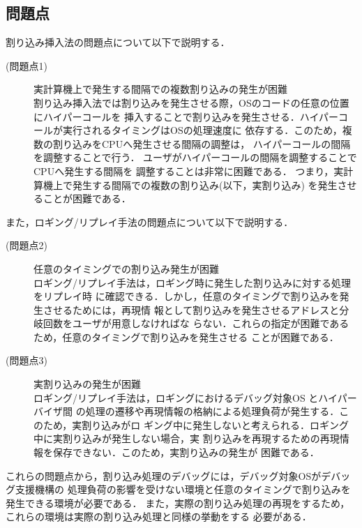 \documentclass[submit,techreq,noauthor,dvipdfmx]{ipsj}
\begin{document}
\subsection{問題点}\label{sec:problem}

割り込み挿入法の問題点について以下で説明する．

\begin{description}
    \item[(問題点1)]実計算機上で発生する間隔での複数割り込みの発生が困難\\
        割り込み挿入法では割り込みを発生させる際，OSのコードの任意の位置にハイパーコールを
        挿入することで割り込みを発生させる．ハイパーコールが実行されるタイミングはOSの処理速度に
        依存する．このため，複数の割り込みをCPUへ発生させる間隔の調整は，
        ハイパーコールの間隔を調整することで行う．
        ユーザがハイパーコールの間隔を調整することでCPUへ発生する間隔を
        調整することは非常に困難である．
        つまり，実計算機上で発生する間隔での複数の割り込み(以下，実割り込み)
        を発生させることが困難である．
\end{description}

また，ロギング/リプレイ手法の問題点について以下で説明する．

\begin{description}
    \item[(問題点2)]任意のタイミングでの割り込み発生が困難\\
        ロギング/リプレイ手法は，ロギング時に発生した割り込みに対する処理をリプレイ時
        に確認できる．しかし，任意のタイミングで割り込みを発生させるためには，再現情
        報として割り込みを発生させるアドレスと分岐回数をユーザが用意しなければな
        らない．これらの指定が困難であるため，任意のタイミングで割り込みを発生させる
        ことが困難である．
    \item[(問題点3)]実割り込みの発生が困難\\
        ロギング/リプレイ手法は，ロギングにおけるデバッグ対象OS とハイパーバイザ間
        の処理の遷移や再現情報の格納による処理負荷が発生する．このため，実割り込みがロ
        ギング中に発生しないと考えられる．ロギング中に実割り込みが発生しない場合，実
        割り込みを再現するための再現情報を保存できない．このため，実割り込みの発生が
        困難である．
\end{description}

これらの問題点から，割り込み処理のデバッグには，デバッグ対象OSがデバッグ支援機構の
処理負荷の影響を受けない環境と任意のタイミングで割り込みを発生できる環境が必要である．
また，実際の割り込み処理の再現をするため，これらの環境は実際の割り込み処理と同様の挙動をする
必要がある．
\end{document}
